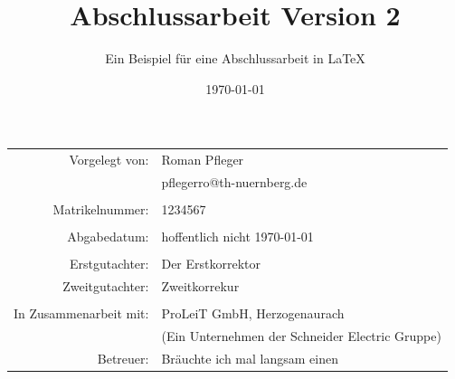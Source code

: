 \documentclass[
    arbeit,
    zitierstil=iso690alp, %
    zeilenabstand=1.15, %
    kopfzeile=true,
    duplex=false, %
    kopfzeilebeititel=false,
    listtotoc=true %
    ]{RPdoc}
\title{Abschlussarbeit Version 2}
\subtitle{Ein Beispiel für eine Abschlussarbeit in LaTeX}
\date{\today}
\begin{document}
\RPintro
\begin{center}
\begin{tabularx}{\textwidth}{@{} r X @{}}
    Vorgelegt von: & Roman Pfleger \\
    & pflegerro@th-nuernberg.de \\
    \\
    Matrikelnummer: & 1234567 \\
    \\
    Abgabedatum: & hoffentlich nicht \today \\
    \\
    Erstgutachter: & Der Erstkorrektor \\
    Zweitgutachter: & Zweitkorrekur \\
    \\
    In Zusammenarbeit mit: & ProLeiT GmbH, Herzogenaurach \\
    & (Ein Unternehmen der Schneider Electric Gruppe) \\
    Betreuer: & Bräuchte ich mal langsam einen
\end{tabularx}
\end{center}

%
{}


\printbibliography[heading=bibintoc]
\appendix

\end{document}
